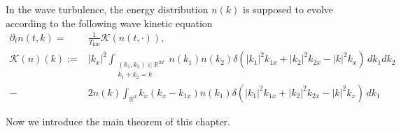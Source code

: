 In the wave turbulence, the energy distribution $n(k)$ is supposed to evolve according to the following wave kinetic equation
\[
\tag{WKE}\label{eq.WKE}
\begin{split}
\partial_t n(t, k) =&\frac{1}{T_{\text{kin}}}\mathcal K\left(n(t, \cdot)\right),
\\
\mathcal K(n)(k):=& |k_x|^2\int_{\substack{(k_1, k_2)\in \mathbb{R}^{2d}\\k_1+k_2=k}}n(k_1) n(k_2)\delta(|k_1|^2k_{1x}+|k_2|^2k_{2x}-|k|^2k_{x})\, dk_1 dk_2
\\
-& 2n(k)\int_{\mathbb{R}^d}k_x(k_x-k_{1x})n(k_1) \delta(|k_1|^2k_{1x}+|k_2|^2k_{2x}-|k|^2k_{x})\, dk_1
\end{split}
\]



Now we introduce the main theorem of this chapter.


